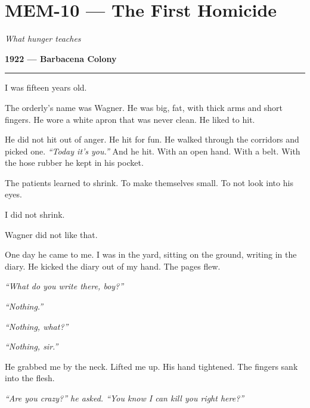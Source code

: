 \section*{\textbf{MEM-10} --- The First Homicide}

\noindent \textit{What hunger teaches}

\noindent \textbf{1922 --- Barbacena Colony}

\vspace{0.5em}\noindent\rule{\textwidth}{0.5pt}\vspace{0.5em}

\noindent I was fifteen years old.

\noindent The orderly's name was Wagner. He was big, fat, with thick arms and short fingers. He wore a white apron that was never clean. He liked to hit.

\noindent He did not hit out of anger. He hit for fun. He walked through the corridors and picked one. \textit{\textquotedblleft{}Today it's you.\textquotedblright{}} And he hit. With an open hand. With a belt. With the hose rubber he kept in his pocket.

\noindent The patients learned to shrink. To make themselves small. To not look into his eyes.

\noindent I did not shrink.

\noindent Wagner did not like that.

\noindent One day he came to me. I was in the yard, sitting on the ground, writing in the diary. He kicked the diary out of my hand. The pages flew.

\noindent \textit{\textquotedblleft{}What do you write there, boy?\textquotedblright{}}

\noindent \textit{\textquotedblleft{}Nothing.\textquotedblright{}}

\noindent \textit{\textquotedblleft{}Nothing, what?\textquotedblright{}}

\noindent \textit{\textquotedblleft{}Nothing, sir.\textquotedblright{}}

\noindent He grabbed me by the neck. Lifted me up. His hand tightened. The fingers sank into the flesh.

\noindent \textit{\textquotedblleft{}Are you crazy?\textquotedblright{}\textit{ he asked. }\textquotedblleft{}You know I can kill you right here?\textquotedblright{}}

